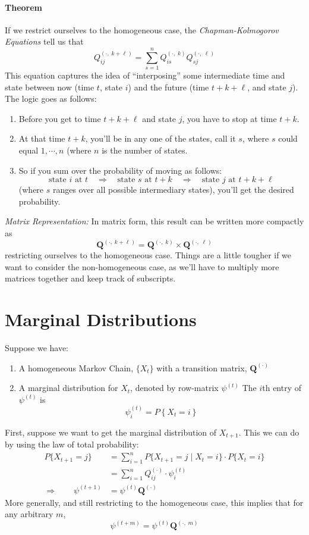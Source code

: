 \documentclass[a4paper,12pt]{scrartcl}
\begin{document}
\paragraph{Theorem} If we restrict ourselves to the 
homogeneous case, 
the {\sl Chapman-Kolmogorov Equations} tell us that 
\[Q^{(\cdot, \; k+\ell)}_{ij} = \sum^n_{s=1} 
    Q^{(\cdot, \; k)}_{is} Q^{(\cdot,\; \ell)}_{sj} \]
This equation captures the idea of ``interposing'' some
intermediate time and state between now (time $t$, state
$i$) and the future (time $t+k+\ell$, and state $j$).
The logic goes as follows:
\begin{enumerate}
    \item Before you get to time $t+k+\ell$ and state $j$, you
	have to stop at time $t+k$.   
    \item At that time $t+k$, you'll be in any one of the states,
	call it $s$, where $s$ could equal $1, \cdots, n$ (where
	$n$ is the number of states.
    \item So if you sum over the probability
	of moving as follows: 
	\[  \text{state $i$ at $t$} \quad \Rightarrow \quad
	    \text{state $s$ at $t+k$} \quad \Rightarrow \quad 
	    \text{state $j$ at $t+k+\ell$} \]
	(where $s$ ranges over all possible intermediary states), 
	you'll get the desired probability.
\end{enumerate}
{\sl Matrix Representation:}
In matrix form, this result can be written more compactly as
    \[ \mathbf{Q}^{(\cdot,\; k+\ell)} = \mathbf{Q}^{(\cdot,\; k)} \times 
      \mathbf{Q}^{(\cdot,\; \ell)}\]
restricting ourselves to the homogeneous case.
Things are a little tougher if we want to consider the 
non-homogeneous case, as we'll have to multiply more matrices 
together and keep track of subscripts.


\newpage
\section{Marginal Distributions}

Suppose we have:
\begin{enumerate}
    \item A homogeneous Markov Chain, $\{X_t\}$ with a transition matrix,
	$\mathbf{Q}^{(\cdot)}$
    \item A marginal distribution for $X_t$, denoted by row-matrix $\psi^{(t)}$ 
	The $i$th entry of $\psi^{(t)}$ is
	\[ \psi^{(t)}_i = P\left\{ X_t = i \right\} \]
\end{enumerate}
First, suppose we want to get the marginal distribution of $X_{t+1}$.
This we can do by using the law of total probability:
\begin{align*}
     P\{X_{t+1} = j\} &= \sum_{i=1}^n 
	P\{X_{t+1} = j \; | \; X_t = i \} \cdot 
	P\{X_{t} = i\} \\
    &= \sum_{i=1}^n 
	Q^{(\cdot)}_{ij} \cdot 
	\psi_i^{(t)} \\
    \Rightarrow \qquad 
    \psi^{(t+1)} &= \psi^{(t)} \mathbf{Q}^{(\cdot)}
\end{align*}
More generally, and still restricting to the homogeneous case, 
this implies that for any arbitrary $m$, 
    \[ \psi^{(t+m)} = \psi^{(t)} \mathbf{Q}^{(\cdot,\; m)} \]
\end{document}
